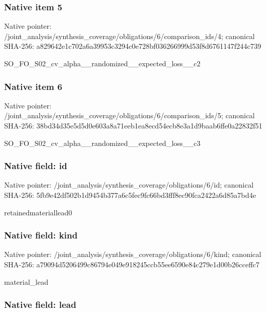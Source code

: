 \documentclass[10pt,a4paper]{article}
\begin{document}
\subsubsection{Native item 5}


Native pointer: /joint\_analysis/synthesi\allowbreak{}s\_coverage/obligations/6\allowbreak{}/comparison\_ids/4; canonical SHA-256: a829642e1c702a6a39953c32\allowbreak{}94c0e728bf036266999d53f8\allowbreak{}d6761147f244c739


SO\_FO\_S02\_cv\_alpha\_\_rand\allowbreak{}omized\_\_expected\_loss\_\_c\allowbreak{}2


\subsubsection{Native item 6}


Native pointer: /joint\_analysis/synthesi\allowbreak{}s\_coverage/obligations/6\allowbreak{}/comparison\_ids/5; canonical SHA-256: 38bd34d35e5d5d0e603a8a71\allowbreak{}eeb1ea8ecd54ecb8e3a1d9ba\allowbreak{}ab6ffe0a22832f51


SO\_FO\_S02\_cv\_alpha\_\_rand\allowbreak{}omized\_\_expected\_loss\_\_c\allowbreak{}3


\subsubsection{Native field: id}


Native pointer: /joint\_analysis/synthesi\allowbreak{}s\_coverage/obligations/6\allowbreak{}/id; canonical SHA-256: 5fb9e42df502b1d9454b377a\allowbreak{}6c5fec9fc66bd3fff8ec90fc\allowbreak{}a2422a6d85a7bd4e


retainedmateriallead0


\subsubsection{Native field: kind}


Native pointer: /joint\_analysis/synthesi\allowbreak{}s\_coverage/obligations/6\allowbreak{}/kind; canonical SHA-256: a79094d5206499c86794e049\allowbreak{}e918245ccb55ee6590e84c27\allowbreak{}9e1d00b26cceffc7


material\_lead


\subsubsection{Native field: lead}
\end{document}
